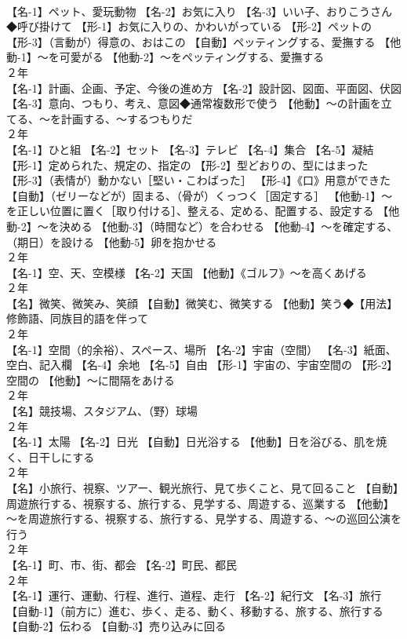 \documentclass[8pt]{extreport}
\begin{document}
\begin{CJK}{UTF8}{min}
\\	【名-1】ペット、愛玩動物 【名-2】お気に入り 【名-3】いい子、おりこうさん◆呼び掛けて 【形-1】お気に入りの、かわいがっている 【形-2】ペットの 【形-3】（言動が）得意の、おはこの 【自動】ペッティングする、愛撫する 【他動-1】～を可愛がる 【他動-2】～をペッティングする、愛撫する
\\	２年	
\\	【名-1】計画、企画、予定、今後の進め方 【名-2】設計図、図面、平面図、伏図 【名-3】意向、つもり、考え、意図◆通常複数形で使う 【他動】～の計画を立てる、～を計画する、～するつもりだ
\\	２年	
\\	【名-1】ひと組 【名-2】セット 【名-3】テレビ 【名-4】集合 【名-5】凝結 【形-1】定められた、規定の、指定の 【形-2】型どおりの、型にはまった 【形-3】（表情が）動かない［堅い・こわばった］ 【形-4】《口》用意ができた 【自動】（ゼリーなどが）固まる、（骨が）くっつく［固定する］ 【他動-1】～を正しい位置に置く［取り付ける］、整える、定める、配置する、設定する 【他動-2】～を決める 【他動-3】（時間など）を合わせる 【他動-4】～を確定する、（期日）を設ける 【他動-5】卵を抱かせる
\\	２年	
\\	【名-1】空、天、空模様 【名-2】天国 【他動】《ゴルフ》～を高くあげる
\\	２年	
\\	【名】微笑、微笑み、笑顔 【自動】微笑む、微笑する 【他動】笑う◆【用法】修飾語、同族目的語を伴って
\\	２年	
\\	【名-1】空間（的余裕）、スペース、場所 【名-2】宇宙（空間） 【名-3】紙面、空白、記入欄 【名-4】余地 【名-5】自由 【形-1】宇宙の、宇宙空間の 【形-2】空間の 【他動】～に間隔をあける
\\	２年	
\\	【名】競技場、スタジアム、（野）球場
\\	２年	
\\	【名-1】太陽 【名-2】日光 【自動】日光浴する 【他動】日を浴びる、肌を焼く、日干しにする
\\	２年	
\\	【名】小旅行、視察、ツアー、観光旅行、見て歩くこと、見て回ること 【自動】周遊旅行する、視察する、旅行する、見学する、周遊する、巡業する 【他動】～を周遊旅行する、視察する、旅行する、見学する、周遊する、～の巡回公演を行う
\\	２年	
\\	【名-1】町、市、街、都会 【名-2】町民、都民
\\	２年	
\\	【名-1】運行、運動、行程、進行、道程、走行 【名-2】紀行文 【名-3】旅行 【自動-1】（前方に）進む、歩く、走る、動く、移動する、旅する、旅行する 【自動-2】伝わる 【自動-3】売り込みに回る

\end{CJK}
\end{document}
